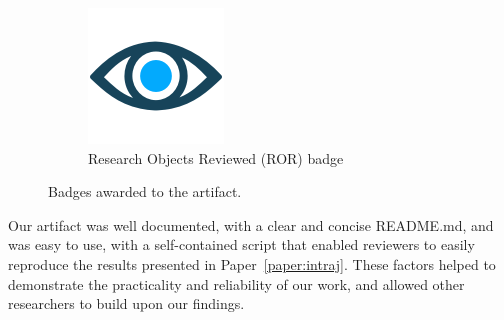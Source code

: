 \begin{figure}[htbp]
\begin{subfigure}{0.3\linewidth}
    \includegraphics[width=\linewidth]{kappa/img/Research_Objects.png}
    \caption{Research Objects Reviewed (ROR) badge}
    \label{fig:ROR}
  \end{subfigure}
  \caption{Badges awarded to the artifact.}
  \label{fig:badges}
\end{figure}

Our artifact was well documented, with a clear and concise README.md, and was easy to
use, with a self-contained script that enabled reviewers to easily reproduce the
results presented in Paper~\ref{paper:intraj}. These factors helped to demonstrate the practicality
and reliability of our work, and allowed other researchers to build upon our findings.


